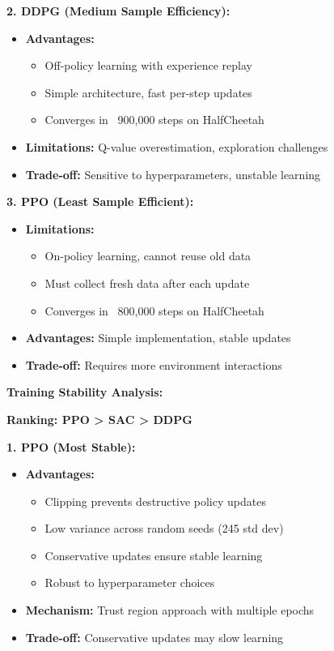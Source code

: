 \documentclass[12pt]{article}
\begin{document}
{{{\textbf{2. DDPG (Medium Sample Efficiency):}
\begin{itemize}
    \item \textbf{Advantages:}
    \begin{itemize}
        \item Off-policy learning with experience replay
        \item Simple architecture, fast per-step updates
        \item Converges in ~900,000 steps on HalfCheetah
    \end{itemize}
    \item \textbf{Limitations:} Q-value overestimation, exploration challenges
    \item \textbf{Trade-off:} Sensitive to hyperparameters, unstable learning
\end{itemize}

\textbf{3. PPO (Least Sample Efficient):}
\begin{itemize}
    \item \textbf{Limitations:}
    \begin{itemize}
        \item On-policy learning, cannot reuse old data
        \item Must collect fresh data after each update
        \item Converges in ~800,000 steps on HalfCheetah
    \end{itemize}
    \item \textbf{Advantages:} Simple implementation, stable updates
    \item \textbf{Trade-off:} Requires more environment interactions
\end{itemize}

\textbf{Training Stability Analysis:}

\textbf{Ranking: PPO > SAC > DDPG}

\textbf{1. PPO (Most Stable):}
\begin{itemize}
    \item \textbf{Advantages:}
    \begin{itemize}
        \item Clipping prevents destructive policy updates
        \item Low variance across random seeds (245 std dev)
        \item Conservative updates ensure stable learning
        \item Robust to hyperparameter choices
    \end{itemize}
    \item \textbf{Mechanism:} Trust region approach with multiple epochs
    \item \textbf{Trade-off:} Conservative updates may slow learning
\end{itemize}

}}}
\end{document}
